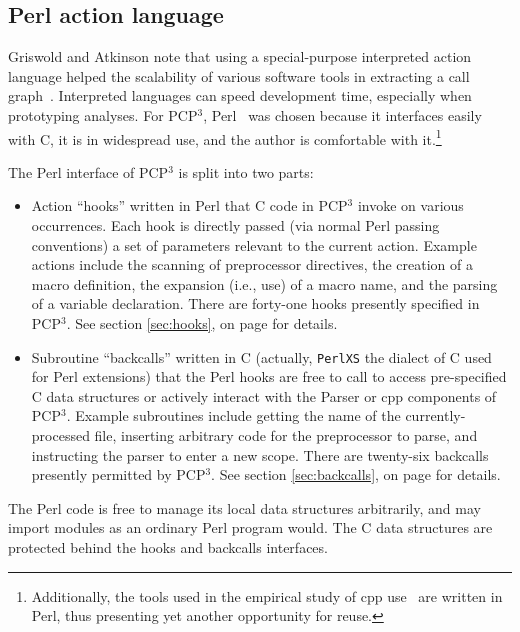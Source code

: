 \documentclass{article}
\newcommand{\pcp}{\mbox{\textsf{PCP}$^3$}}
\newcommand{\Cpp}{\mbox{\textsf{cpp}}}
\newcommand{\Perl}{\mbox{\textsf{Perl}}}
\newcommand{\C}{\mbox{\textsf{C}}}
\newcommand{\sectionref}[1]{section \ref{#1}, on page \pageref{#1}}
\newcommand{\ie}{i.e.,}
\begin{document}
\subsection{Perl action language}

Griswold and Atkinson note that using a special-purpose interpreted
action language helped the scalability of various software tools in
extracting a call graph~\cite{Griswold96}.  Interpreted languages can
speed development time, especially when prototyping analyses.  For
\pcp{}, \Perl{}~\cite{Perl} was chosen because it interfaces
easily with \C{}, it is in widespread use, and the author is comfortable
with it.\footnote{Additionally, the tools used in the empirical study of
  \Cpp{} use~\cite{EmpCpp-TR}  are written in \Perl{}, thus
  presenting yet another opportunity for reuse.}

The \Perl{} interface of \pcp{} is split into two parts:

\begin{itemize}
\item Action ``hooks'' written in \Perl{} that \C{} code in \pcp{}
      invoke on various occurrences. Each hook is directly passed (via
      normal \Perl{} passing conventions) a set of parameters relevant
      to the current action.  Example actions include the scanning of
      preprocessor directives, the creation of a macro definition, the
      expansion (\ie{} use) of a macro name, and the parsing of a
      variable declaration.  There are forty-one hooks presently
      specified in \pcp{}. See \sectionref{sec:hooks} for details.
\item Subroutine ``backcalls'' written in \C{} (actually,
      \texttt{PerlXS} the dialect of \C{} used for \Perl{} extensions)
      that the \Perl{} hooks are free to call to access pre-specified
      \C{} data structures or actively interact with the Parser or
      \Cpp{} components of \pcp{}.  Example subroutines include getting
      the name of the currently-processed file, inserting arbitrary code
      for the preprocessor to parse, and instructing the parser to enter
      a new scope.  There are twenty-six backcalls presently permitted
      by \pcp{}.  See \sectionref{sec:backcalls} for details.
\end{itemize}

\noindent The \Perl{} code is free to manage its local data structures
      arbitrarily, and may import modules as an ordinary \Perl{} program
      would.  The \C{} data structures are protected behind the hooks
      and backcalls interfaces.
\end{document}
